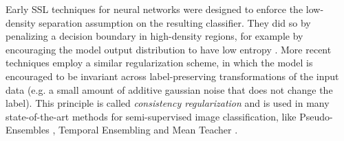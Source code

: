 \documentclass[journal,twoside,web]{ieeecolor}
\DeclareMathOperator*{\E}{\mathbb{E}}
\begin{document}
Early SSL techniques for neural networks were designed to enforce the low-density
separation assumption on the resulting classifier. They did so by penalizing
a decision boundary in high-density regions, for example by
encouraging the model output distribution to have low entropy \cite{ssl_book}.
More recent techniques employ a similar regularization scheme, in which the model
is encouraged to be invariant across label-preserving transformations
of the input data (e.g. a small amount of additive gaussian noise that does not
change the label).
This principle is called \emph{consistency regularization} and is used in many
state-of-the-art methods for semi-supervised image classification, like
Pseudo-Ensembles \cite{sajjadi2016regularization},  Temporal Ensembling
\cite{laine2016temporal} and  Mean Teacher \cite{tarvainen2017mean}.
\end{document}
